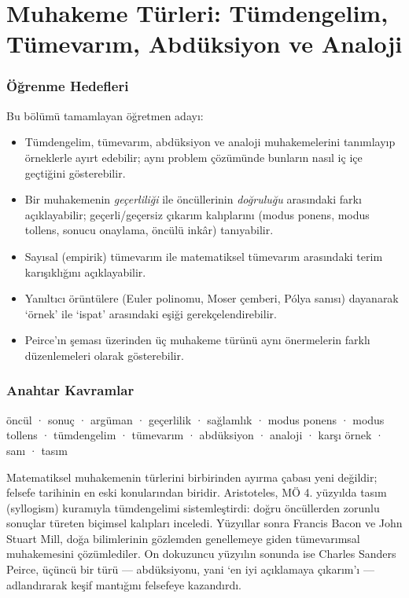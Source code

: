 \chapter{Muhakeme Türleri: Tümdengelim, Tümevarım, Abdüksiyon ve Analoji}
\label{chap:muhakeme-turleri}
\thispagestyle{plain}

\subsection*{Öğrenme Hedefleri}
Bu bölümü tamamlayan öğretmen adayı:
\begin{itemize}[leftmargin=1.4em]
\item Tümdengelim, tümevarım, abdüksiyon ve analoji muhakemelerini tanımlayıp örneklerle ayırt edebilir; aynı problem çözümünde bunların nasıl iç içe geçtiğini gösterebilir.
\item Bir muhakemenin \emph{geçerliliği} ile öncüllerinin \emph{doğruluğu} arasındaki farkı açıklayabilir; geçerli/geçersiz çıkarım kalıplarını (modus ponens, modus tollens, sonucu onaylama, öncülü inkâr) tanıyabilir.
\item Sayısal (empirik) tümevarım ile matematiksel tümevarım arasındaki terim karışıklığını açıklayabilir.
\item Yanıltıcı örüntülere (Euler polinomu, Moser çemberi, Pólya sanısı) dayanarak ‘örnek’ ile ‘ispat’ arasındaki eşiği gerekçelendirebilir.
\item Peirce’ın şeması üzerinden üç muhakeme türünü aynı önermelerin farklı düzenlemeleri olarak gösterebilir.
\end{itemize}

\subsection*{Anahtar Kavramlar}
{\small öncül · sonuç · argüman · geçerlilik · sağlamlık · modus ponens · modus tollens · tümdengelim · tümevarım · abdüksiyon · analoji · karşı örnek · sanı · tasım}

Matematiksel muhakemenin türlerini birbirinden ayırma çabası yeni değildir; felsefe tarihinin en eski konularından biridir. Aristoteles, MÖ 4. yüzyılda tasım (syllogism) kuramıyla tümdengelimi sistemleştirdi: doğru öncüllerden zorunlu sonuçlar türeten biçimsel kalıpları inceledi. Yüzyıllar sonra Francis Bacon ve John Stuart Mill, doğa bilimlerinin gözlemden genellemeye giden tümevarımsal muhakemesini çözümlediler. On dokuzuncu yüzyılın sonunda ise Charles Sanders Peirce, üçüncü bir türü — abdüksiyonu, yani ‘en iyi açıklamaya çıkarım’ı — adlandırarak keşif mantığını felsefeye kazandırdı.

